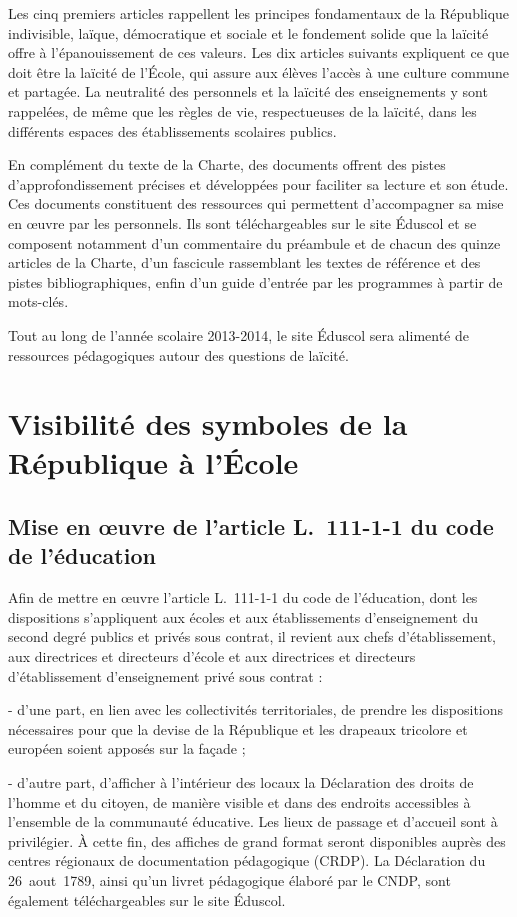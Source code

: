 Les cinq premiers articles rappellent les principes fondamentaux de la République indivisible, laïque, démocratique et sociale et le fondement solide que la laïcité offre à l’épanouissement de ces valeurs. Les dix articles suivants expliquent ce que doit être la laïcité de l’École, qui assure aux élèves l’accès à une culture commune et partagée. La neutralité des personnels et la laïcité des enseignements y sont rappelées, de même que les règles de vie, respectueuses de la laïcité, dans les différents espaces des établissements scolaires publics.

En complément du texte de la Charte, des documents offrent des pistes d’approfondissement précises et développées pour faciliter sa lecture et son étude. Ces documents constituent des ressources qui permettent d’accompagner sa mise en œuvre par les personnels. Ils sont téléchargeables sur le site Éduscol et se composent notamment d’un commentaire du préambule et de chacun des quinze articles de la Charte, d’un fascicule rassemblant les textes de référence et des pistes bibliographiques, enfin d’un guide d’entrée par les programmes à partir de mots-clés.

Tout au long de l’année scolaire 2013-2014, le site Éduscol sera alimenté de ressources pédagogiques autour des questions de laïcité.

\section{Visibilité des symboles de la République à l’École}
\subsection{Mise en œuvre de l’article L.~111-1-1 du code de l’éducation}
Afin de mettre en œuvre l’article L.~111-1-1 du code de l’éducation, dont les dispositions s’appliquent aux écoles et aux établissements d’enseignement du second degré publics et privés sous contrat, il revient aux chefs d’établissement, aux directrices et directeurs d’école et aux directrices et directeurs d’établissement d’enseignement privé sous contrat :

- d’une part, en lien avec les collectivités territoriales, de prendre les dispositions nécessaires pour que la devise de la République et les drapeaux tricolore et européen soient apposés sur la façade ;

- d’autre part, d’afficher à l’intérieur des locaux la Déclaration des droits de l’homme et du citoyen, de manière visible et dans des endroits accessibles à l’ensemble de la communauté éducative. Les lieux de passage et d’accueil sont à privilégier. À cette fin, des affiches de grand format seront disponibles auprès des centres régionaux de documentation pédagogique (CRDP). La Déclaration du 26~aout~1789, ainsi qu’un livret pédagogique élaboré par le CNDP, sont également téléchargeables sur le site Éduscol.

